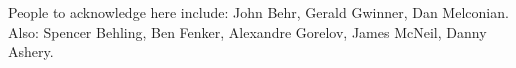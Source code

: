 

\clearpage
\begin{acknowledgement}
People to acknowledge here include:  John Behr, Gerald Gwinner, Dan Melconian.  Also:  Spencer Behling, Ben Fenker, Alexandre Gorelov, James McNeil, Danny Ashery.
\end{acknowledgement}
